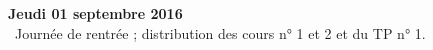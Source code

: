 \documentclass[12pt,a4paper]{article}
\begin{document}
% 
%  
%  
% 
% 

\noindent\textbf{Jeudi 01 septembre 2016 }\\
\bu\ Journée de rentrée ; distribution des cours n° 1 et 2 et du TP n° 1. 

\label{end}
\end{document}
